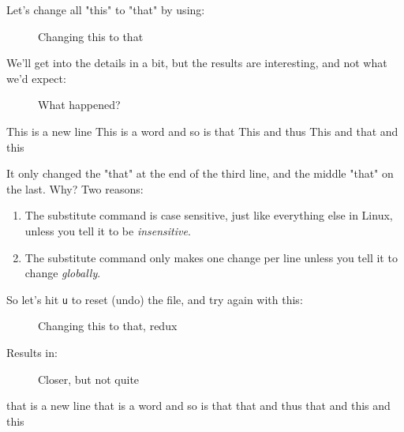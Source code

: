 \documentclass[10pt,american,]{book}
\newenvironment{Shaded}{\begin{snugshade}}{\end{snugshade}}
\newcommand{\KeywordTok}[1]{\textcolor[rgb]{0.13,0.29,0.53}{\textbf{{#1}}}}
\newcommand{\OtherTok}[1]{\textcolor[rgb]{0.56,0.35,0.01}{{#1}}}
\newcommand{\NormalTok}[1]{{#1}}
\numberwithin{figure}{chapter}
\DeclareRobustCommand{\drcap}[1]{\begin{figure}[H]\caption{#1}\end{figure}}
\DeclareRobustCommand{\drvic}[2]{\index{vi Commands!#1 (#2)}}
\renewcommand{\KeywordTok}[1]{{#1}}
\renewcommand{\OtherTok}[1]{{#1}}
\renewcommand{\NormalTok}[1]{{#1}}
\begin{document}
Let's change all "this" to "that" by using:

\drcap{Changing this to that}

\begin{Shaded}
\end{Shaded}

We'll get into the details in a bit, but the results are interesting,
and not what we'd expect:

\drcap{What happened?}

\begin{Shaded}
\begin{Highlighting}[]
\KeywordTok{This} \NormalTok{is a new line}
\KeywordTok{This} \NormalTok{is a word}
\KeywordTok{and} \NormalTok{so is that}
\KeywordTok{This} \NormalTok{and thus}
\KeywordTok{This} \NormalTok{and that and this}
\end{Highlighting}
\end{Shaded}

It only changed the "that" at the end of the third line, and the middle
"that" on the last. Why? Two reasons:

\begin{enumerate}
\def\labelenumi{\arabic{enumi}.}
\item
  The substitute command is case sensitive, just like everything else in
  Linux, unless you tell it to be \emph{insensitive}.
\item
  The substitute command only makes one change per line unless you tell
  it to change \emph{globally}.
\end{enumerate}

So let's hit \texttt{u}\drvic{u}{Undo} to reset (undo) the file, and try
again with this:

\drcap{Changing this to that, redux}

\begin{Shaded}
\end{Shaded}

Results in:

\drcap{Closer, but not quite}

\begin{Shaded}
\begin{Highlighting}[]
\KeywordTok{that} \NormalTok{is a new line}
\KeywordTok{that} \NormalTok{is a word}
\KeywordTok{and} \NormalTok{so is that}
\KeywordTok{that} \NormalTok{and thus}
\KeywordTok{that} \NormalTok{and this and this}
\end{Highlighting}
\end{Shaded}
\end{document}
